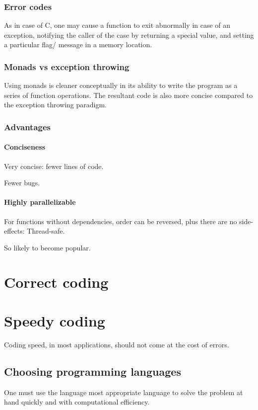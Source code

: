 \documentclass[oneside, article]{memoir}
\begin{document}
\subsection{Error codes}
As in case of C, one may cause a function to exit abnormally in case of an exception, notifying the caller of the case by returning a special value, and setting a particular flag/ message in a memory location.

\subsection{Monads vs exception throwing}
Using monads is cleaner conceptually in its ability to write the program as a series of function operations. The resultant code is also more concise compared to the exception throwing paradigm.


\subsection{Advantages}
\subsubsection{Conciseness}
Very concise: fewer lines of code.

Fewer bugs. 

\subsubsection{Highly parallelizable}
For functions without dependencies, order can be reversed, plus there are no side-effects: Thread-safe.

So likely to become popular.


\chapter{Correct coding}

\chapter{Speedy coding}
Coding speed, in most applications, should not come at the cost of errors.

\section{Choosing programming languages}
One must use the language most appropriate language to solve the problem at hand quickly and with computational efficiency.
\end{document}

